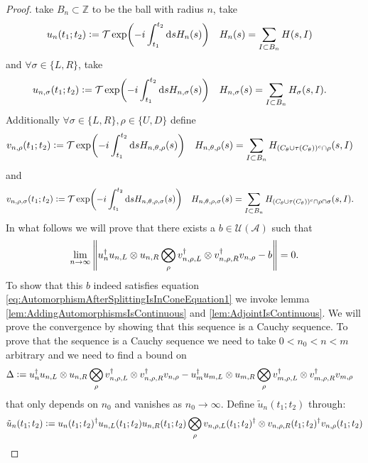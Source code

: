 \documentclass[12pt,a4paper,twoside]{article}
\renewcommand{\d}{\text{d}}
\newcommand{\defeq}{\vcentcolon=}
\newcommand{\UU}{\mathcal U}
\newcommand{\ZZ}{\mathbb Z}
\renewcommand{\AA}{\mathcal A}
\theoremstyle{definition}
\numberwithin{equation}{section}
\begin{document}
 \begin{proof}
 	take $B_n\subset\ZZ$ to be the ball with radius $n$, take
 	\begin{align}
 		u_n(t_1;t_2)&\defeq \mathcal{T}\exp(-i\int_{t_1}^{t_2} \d s H_n(s))&H_n(s)&=\sum_{I\subset B_n}H(s,I)
 	\end{align}
 	and $\forall \sigma\in\{L,R\}$, take
 	\begin{align}
	 	u_{n,\sigma}(t_1;t_2)&\defeq \mathcal{T}\exp(-i\int_{t_1}^{t_2} \d s H_{n,\sigma}(s))&H_{n,\sigma}(s)&=\sum_{I\subset B_n}H_\sigma(s,I).
 	\end{align}
 	Additionally $\forall\sigma\in\{L,R\},\rho\in\{U,D\}$ define
 	\begin{align}
 		v_{n,\rho}(t_1;t_2)&\defeq \mathcal{T}\exp(-i\int_{t_1}^{t_2} \d s H_{n,\theta,\rho}(s))&H_{n,\theta,\rho}(s)&=\sum_{I\subset B_n}H_{(C_\theta\cup\tau(C_\theta))^c\cap \rho}(s,I)
 	\end{align}
 	and
 	\begin{align}
 		v_{n,\rho,\sigma}(t_1;t_2)&\defeq \mathcal{T}\exp(-i\int_{t_1}^{t_2} \d s H_{n,\theta,\rho,\sigma}(s))&H_{n,\theta,\rho,\sigma}(s)&=\sum_{I\subset B_n}H_{(C_\theta\cup\tau(C_\theta))^c\cap \rho\cap\sigma}(s,I).
 	\end{align}
 	In what follows we will prove that there exists a $b\in\UU(\AA)$ such that
 	\begin{equation}
	 	\lim_{n\rightarrow\infty}\norm{u_n^\dagger u_{n,L}\otimes u_{n,R} \bigotimes_{\rho}v_{n,\rho,L}^\dagger\otimes v_{n,\rho,R}^\dagger v_{n,\rho}-b}=0.
 	\end{equation}
 	To show that this $b$ indeed satisfies equation \eqref{eq:AutomorphismAfterSplittingIsInConeEquation1} we invoke lemma \ref{lem:AddingAutomorphismsIsContinuous} and \ref{lem:AdjointIsContinuous}. We will prove the convergence by showing that this sequence is a Cauchy sequence. To prove that the sequence is a Cauchy sequence we need to take $0<n_0<n<m$ arbitrary and we need to find a bound on
 	\begin{align}
 		\Delta&\defeq u_n^\dagger u_{n,L}\otimes u_{n,R} \bigotimes_{\rho}v_{n,\rho,L}^\dagger\otimes v_{n,\rho,R}^\dagger v_{n,\rho}-u_m^\dagger u_{m,L}\otimes u_{m,R} \bigotimes_{\rho}v_{m,\rho,L}^\dagger\otimes v_{m,\rho,R}^\dagger v_{m,\rho}
 	\end{align}
 	that only depends on $n_0$ and vanishes as $n_0\rightarrow\infty$. Define $\tilde{u}_n(t_1;t_2)$ through:
 	\begin{align}
 		\tilde{u}_n(t_1;t_2)\defeq u_n(t_1;t_2)^\dagger u_{n,L}(t_1;t_2)u_{n,R}(t_1;t_2)\bigotimes_{\rho}v_{n,\rho,L}(t_1;t_2)^\dagger\otimes v_{n,\rho,R}(t_1;t_2)^\dagger v_{n,\rho}(t_1;t_2)

\end{align}
\end{proof}
\end{document}
